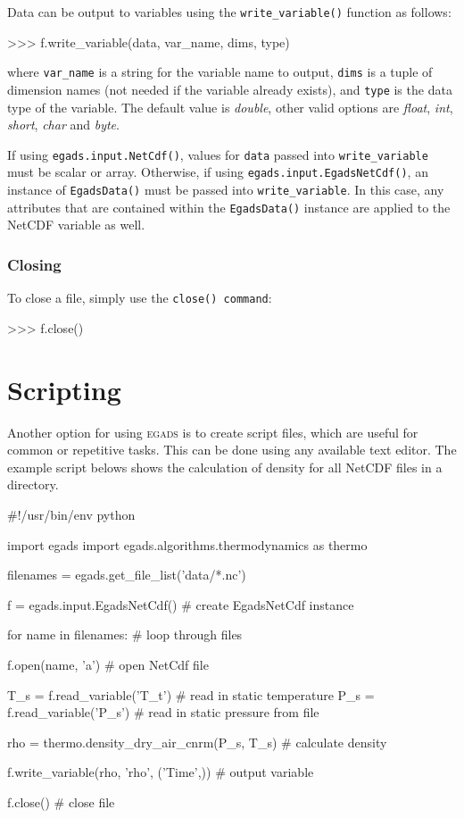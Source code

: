 \documentclass[a4paper,11pt]{report}
\newcommand{\egads}{\textsc{egads} }
\begin{document}
Data can be output to variables using the \verb|write_variable()| function as follows:

\begin{command}
    >>> f.write_variable(data, var_name, dims, type)
\end{command}

where \verb|var_name| is a string for the variable name to output, \verb|dims| is a tuple of dimension names (not needed if the variable already exists), and \verb|type| is the data type of the variable. The default value is \textit{double}, other valid options are \textit{float}, \textit{int}, \textit{short}, \textit{char} and \textit{byte}. 

If using \verb|egads.input.NetCdf()|, values for \verb|data| passed into \verb|write_variable| must be scalar or array. Otherwise, if using \verb|egads.input.EgadsNetCdf()|, an instance of \verb|EgadsData()| must be passed into \verb|write_variable|. In this case, any attributes that are contained within the \verb|EgadsData()| instance are applied to the NetCDF variable as well.

\subsubsection{Closing}

To close a file, simply use the \verb|close() command|:

\begin{command}
    >>> f.close()
\end{command}

\section{Scripting}

Another option for using \egads is to create script files, which are useful for common or repetitive tasks. This can be done using any available text editor. The example script belows shows the calculation of density for all NetCDF files in a directory.

\begin{code}
#!/usr/bin/env python

import egads
import egads.algorithms.thermodynamics as thermo

filenames = egads.get_file_list('data/*.nc')

f = egads.input.EgadsNetCdf()   # create EgadsNetCdf instance

for name in filenames:          # loop through files

    f.open(name, 'a')            # open NetCdf file 

    T_s = f.read_variable('T_t') # read in static temperature
    P_s = f.read_variable('P_s') # read in static pressure from file

    rho = thermo.density_dry_air_cnrm(P_s, T_s)  # calculate density

    f.write_variable(rho, 'rho', ('Time',))      # output variable

    f.close()                                    # close file


\end{code}
\end{document}
